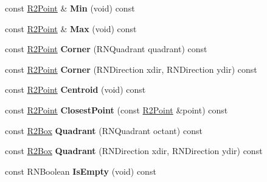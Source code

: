 \begin{DoxyCompactItemize}
\item 
const \hyperlink{class_r2_point}{R2\+Point} \& {\bfseries Min} (void) const \hypertarget{class_r2_box_adf65e166cef0b308be655c93dc6cbcdf}{}\label{class_r2_box_adf65e166cef0b308be655c93dc6cbcdf}

\item 
const \hyperlink{class_r2_point}{R2\+Point} \& {\bfseries Max} (void) const \hypertarget{class_r2_box_a8a815031a0e0945134d6860bc99ac411}{}\label{class_r2_box_a8a815031a0e0945134d6860bc99ac411}

\item 
const \hyperlink{class_r2_point}{R2\+Point} {\bfseries Corner} (R\+N\+Quadrant quadrant) const \hypertarget{class_r2_box_a8ca9227724e7174282f7e69d0b2d39c2}{}\label{class_r2_box_a8ca9227724e7174282f7e69d0b2d39c2}

\item 
const \hyperlink{class_r2_point}{R2\+Point} {\bfseries Corner} (R\+N\+Direction xdir, R\+N\+Direction ydir) const \hypertarget{class_r2_box_a67ab8c1e3f3376ae1d4a15ab1b7f621b}{}\label{class_r2_box_a67ab8c1e3f3376ae1d4a15ab1b7f621b}

\item 
const \hyperlink{class_r2_point}{R2\+Point} {\bfseries Centroid} (void) const \hypertarget{class_r2_box_a78831c39aa836c228bced6c50233f19c}{}\label{class_r2_box_a78831c39aa836c228bced6c50233f19c}

\item 
const \hyperlink{class_r2_point}{R2\+Point} {\bfseries Closest\+Point} (const \hyperlink{class_r2_point}{R2\+Point} \&point) const \hypertarget{class_r2_box_acacf37f0f104fc67a2df2596daacd53a}{}\label{class_r2_box_acacf37f0f104fc67a2df2596daacd53a}

\item 
const \hyperlink{class_r2_box}{R2\+Box} {\bfseries Quadrant} (R\+N\+Quadrant octant) const \hypertarget{class_r2_box_a2786f7110cc993e1af6fdb8ca4e4bc7c}{}\label{class_r2_box_a2786f7110cc993e1af6fdb8ca4e4bc7c}

\item 
const \hyperlink{class_r2_box}{R2\+Box} {\bfseries Quadrant} (R\+N\+Direction xdir, R\+N\+Direction ydir) const \hypertarget{class_r2_box_a19f1e394e6aefe2cd6057298a5f9bfea}{}\label{class_r2_box_a19f1e394e6aefe2cd6057298a5f9bfea}

\item 
const R\+N\+Boolean {\bfseries Is\+Empty} (void) const \hypertarget{class_r2_box_ab5f8331a43680ef57fd3eb09f8b46dfa}{}\label{class_r2_box_ab5f8331a43680ef57fd3eb09f8b46dfa}


\end{DoxyCompactItemize}
